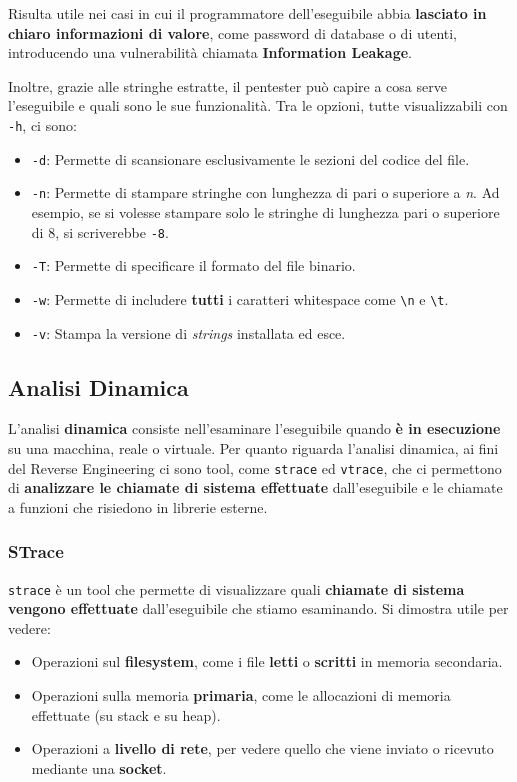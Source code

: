 \documentclass{article}
\begin{document}
Risulta utile nei casi in cui il programmatore dell'eseguibile abbia \textbf{lasciato in chiaro informazioni di valore}, come password di database o di utenti, introducendo una vulnerabilità chiamata \textbf{Information Leakage}.

Inoltre, grazie alle stringhe estratte, il pentester può capire a cosa serve l'eseguibile e quali sono le sue funzionalità. Tra le opzioni, tutte visualizzabili con \verb|-h|, ci sono:
\begin{itemize}
	\item \verb|-d|: Permette di scansionare esclusivamente le sezioni del codice del file.
	
	\item \verb|-n|: Permette di stampare stringhe con lunghezza di pari o superiore a \textit{n}. Ad esempio, se si volesse stampare solo le stringhe di lunghezza pari o superiore di 8, si scriverebbe \verb|-8|.
	
	\item \verb|-T|: Permette di specificare il formato del file binario.
	
	\item \verb|-w|: Permette di includere \textbf{tutti} i caratteri whitespace come \verb|\n| e \verb|\t|. 
	
	\item \verb|-v|: Stampa la versione di \textit{strings} installata ed esce.
\end{itemize}

\newpage

\subsection{Analisi Dinamica}
L'analisi \textbf{dinamica} consiste nell'esaminare l'eseguibile quando \textbf{è in esecuzione} su una macchina, reale o virtuale. Per quanto riguarda l'analisi dinamica, ai fini del Reverse Engineering ci sono tool, come \verb|strace| ed \verb|vtrace|, che ci permettono di \textbf{analizzare le chiamate di sistema effettuate} dall’eseguibile e le chiamate a funzioni che risiedono in librerie esterne.

\subsubsection{STrace}
\verb|strace| è un tool che permette di visualizzare quali \textbf{chiamate di sistema vengono effettuate} dall’eseguibile che stiamo esaminando. Si dimostra utile per vedere:
\begin{itemize}
	\item Operazioni sul \textbf{filesystem}, come i file \textbf{letti} o \textbf{scritti} in memoria secondaria.
	
	\item Operazioni sulla memoria \textbf{primaria}, come le allocazioni di memoria effettuate (su stack e su heap).
	
	\item Operazioni a \textbf{livello di rete}, per vedere quello che viene inviato o ricevuto mediante una \textbf{socket}.
\end{itemize}
\end{document}
